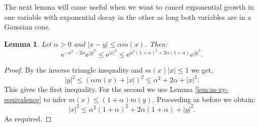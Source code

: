 \documentclass{amsart}
\newtheorem{lemma}{Lemma}
\theoremstyle{remark}
\renewcommand{\leq}{\leqslant}
\renewcommand{\leq}{\leqslant}
\newcommand{\e}{\mathrm{e}} %
\renewcommand{\leq}{\leqslant}%
\begin{document}
The next lemma will come useful when we want to cancel exponential
growth in one variable with exponential decay in the other as long
both variables are in a Gaussian cone.
\begin{lemma}\label{lem:Cone-Gaussians-comparable}
  Let $\alpha > 0$ and $|x - y| \leq \alpha m(x)$. Then:
  \begin{equation*}
   \e^{-\alpha^2-2\alpha} \e^{|y|^2}
  \leq \e^{|x|^2} \leq
    \e^{\alpha^2(1 + \alpha)^2+2\alpha(1 + \alpha)} \e^{|y|^2} .
  \end{equation*}
\end{lemma}
\begin{proof}
  By the inverse triangle inequality and $m(x)|x| \leq 1$ we get, 
  \begin{equation*}
    |y|^2 \leq (\alpha m(x) + |x|)^2 \leq \alpha^2 + 2 \alpha + |x|^2.
  \end{equation*}
This gives the first inequality.  For the second we use
  Lemma \ref{lem:m-xy-equivalence} to infer $m(x) \leq (1 + \alpha)
  m(y)$. Proceeding as before we obtain: 
  \begin{equation*}
    |x|^2 \leq \alpha^2 (1 + \alpha)^2 + 2 \alpha (1 + \alpha) + |y|^2.
  \end{equation*}
As required.
%  
\end{proof}
\end{document}
